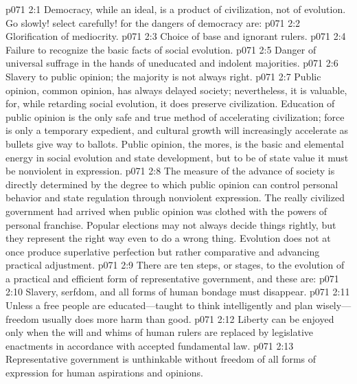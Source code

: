 \vs p071 2:1 Democracy, while an ideal, is a product of civilization, not of evolution. Go slowly! select carefully! for the dangers of democracy are:
\pc \vs p071 2:2 \bibnobreakspace Glorification of mediocrity.
\vs p071 2:3 \bibnobreakspace Choice of base and ignorant rulers.
\vs p071 2:4 \bibnobreakspace Failure to recognize the basic facts of social evolution.
\vs p071 2:5 \bibnobreakspace Danger of universal suffrage in the hands of uneducated and indolent majorities.
\vs p071 2:6 \bibnobreakspace Slavery to public opinion; the majority is not always right.
\pc \vs p071 2:7 Public opinion, common opinion, has always delayed society; nevertheless, it is valuable, for, while retarding social evolution, it does preserve civilization. Education of public opinion is the only safe and true method of accelerating civilization; force is only a temporary expedient, and cultural growth will increasingly accelerate as bullets give way to ballots. Public opinion, the mores, is the basic and elemental energy in social evolution and state development, but to be of state value it must be nonviolent in expression.
\vs p071 2:8 The measure of the advance of society is directly determined by the degree to which public opinion can control personal behavior and state regulation through nonviolent expression. The really civilized government had arrived when public opinion was clothed with the powers of personal franchise. Popular elections may not always decide things rightly, but they represent the right way even to do a wrong thing. Evolution does not at once produce superlative perfection but rather comparative and advancing practical adjustment.
\pc \vs p071 2:9 There are ten steps, or stages, to the evolution of a practical and efficient form of representative government, and these are:
\pc \vs p071 2:10 \bibnobreakspace {} Slavery, serfdom, and all forms of human bondage must disappear.
\pc \vs p071 2:11 \bibnobreakspace {} Unless a free people are educated---taught to think intelligently and plan wisely---freedom usually does more harm than good.
\pc \vs p071 2:12 \bibnobreakspace {} Liberty can be enjoyed only when the will and whims of human rulers are replaced by legislative enactments in accordance with accepted fundamental law.
\pc \vs p071 2:13 \bibnobreakspace {} Representative government is unthinkable without freedom of all forms of expression for human aspirations and opinions.
